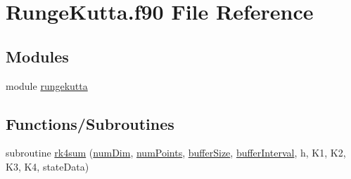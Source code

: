 \hypertarget{RungeKutta_8f90}{}\section{Runge\+Kutta.\+f90 File Reference}
\label{RungeKutta_8f90}
\subsection*{Modules}
\begin{DoxyCompactItemize}
\item 
module \hyperlink{namespacerungekutta}{rungekutta}
\end{DoxyCompactItemize}
\subsection*{Functions/\+Subroutines}
\begin{DoxyCompactItemize}
\item 
subroutine \hyperlink{namespacerungekutta_a265553b049764e513a864c65b65a53b2}{rk4sum} (\hyperlink{SATKernels_8H_a680185db8546de161968dabace9e94f1}{num\+Dim}, \hyperlink{ViscidKernels_8H_adf0bf75d0875d1bb42a5348bee7b7bfd}{num\+Points}, \hyperlink{SpecialKernels_8H_aa9426cdf16e85054db35e88f9b68c6be}{buffer\+Size}, \hyperlink{WENOKernels_8H_ad1001168d5432b52e6d0636f4dc0e60c}{buffer\+Interval}, h, K1, K2, K3, K4, state\+Data)
\end{DoxyCompactItemize}
